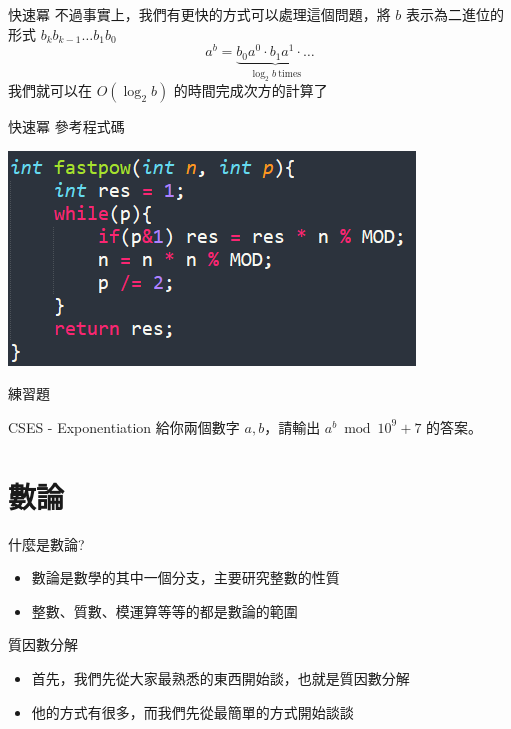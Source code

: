 \documentclass[aspectratio=169]{beamer}
\begin{document}
\begin{frame}{快速冪} 
    不過事實上，我們有更快的方式可以處理這個問題，將 $b$ 表示為二進位的形式 $b_k b_{k-1} \ldots b_1b_0$
    $$a^b = \underbrace{b_0 a^0 \cdot b_1 a^1 \cdot \dots}_{\log_2{b} \ \text{times}}$$
    我們就可以在 $O(\log_2{b})$ 的時間完成次方的計算了
\end{frame}

\begin{frame}{快速冪} 
    參考程式碼
    \begin{center}
        \includegraphics[]{images/code8.png}
    \end{center}
\end{frame}

\begin{frame}{練習題} 
    \begin{block}{CSES - Exponentiation}
        給你兩個數字 $a,b$，請輸出 $a^b \bmod 10^9+7$ 的答案。
    \end{block}
\end{frame}

\section{數論}

\begin{frame}{什麼是數論?}
    \begin{itemize}
        \item 數論是數學的其中一個分支，主要研究整數的性質
        \item 整數、質數、模運算等等的都是數論的範圍
    \end{itemize}
\end{frame}

\begin{frame}{質因數分解}
    \begin{itemize}
        \item 首先，我們先從大家最熟悉的東西開始談，也就是質因數分解
        \item 他的方式有很多，而我們先從最簡單的方式開始談談
    \end{itemize}
\end{frame}
\end{document}
